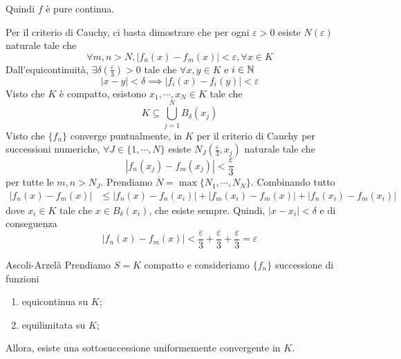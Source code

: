\documentclass[a4paper]{article}
\begin{document}
Quindi \(f\) è pure continua.

\begin{snippetproof}{}
    Per il criterio di Cauchy,
    ci basta dimostrare che per ogni \(\varepsilon > 0\) esiste \(N(\varepsilon)\) naturale tale che
    \[
        \forall m,n > N,
        |f_n(x) - f_m(x)| < \varepsilon, \forall x \in K
    \]
    Dall'equicontinuità, \(\exists \delta\left(\frac{\varepsilon}{3}\right) > 0\)
    tale che \(\forall x,y \in K\) e \(i \in \mathbb{N}\)
    \[
        |x-y| < \delta \implies
        |f_i(x) - f_i(y)| < \varepsilon
    \]
    Visto che \(K\) è compatto, esistono \(x_1, \cdots, x_N \in K\)
    tale che
    \[
        K \subseteq \bigcup_{j=1}^N B_\delta(x_j)
    \]
    Visto che \(\{f_n\}\) converge puntualmente, in \(K\)
    per il criterio di Cauchy per successioni numeriche,
    \(\forall J \in \{1, \cdots, N\}\) esiste \(N_J\left(\frac{\varepsilon}{3}, x_j\right)\)
    naturale tale che
    \[
        |f_n(x_j) - f_m(x_j)| < \frac{\varepsilon}{3}
    \]
    per tutte le \(m,n > N_J\).
    Prendiamo \(\overline N = \max \{N_1, \cdots, N_N\}\).
    Combinando tutto
    \begin{align*}
        |f_n(x) - f_m(x)| &\leq |f_n(x) - f_n(x_i)| + |f_m(x_i) - f_m(x)|
        + |f_n(x_i) - f_m(x_i)|
    \end{align*}
    dove \(x_i \in K\) tale che \(x \in B_\delta(x_i)\), che esiste sempre.
    Quindi, \(|x-x_i| < \delta \) e di conseguenza
    \[
        |f_n(x) - f_m(x)| < \frac{\varepsilon}{3} + \frac{\varepsilon}{3} + \frac{\varepsilon}{3} = \varepsilon
    \]
\end{snippetproof}

\begin{snippettheorem}{Ascoli-Arzelà}
    Prendiamo \(S=K\) compatto e consideriamo
    \(\{f_n\}\) successione di funzioni
    \begin{enumerate}
        \item equicontinua su \(K\);
        \item equilimitata su \(K\);
    \end{enumerate}
    Allora, esiste una sottosuccessione uniformemente convergente in \(K\).
\end{snippettheorem}
\end{document}

